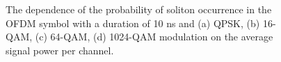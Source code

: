 \begin{figure}[htpb]
\begin{minipage}[h]{0.47\linewidth}
{        }
    \end{minipage}
    \vfill
    \begin{minipage}[h]{0.47\linewidth}
    \end{minipage}
    \hfill
    \begin{minipage}[h]{0.47\linewidth}
    \end{minipage}

    \caption{The dependence of the probability of soliton occurrence in the OFDM symbol with a duration of 10 ns and (a) QPSK, (b) 16-QAM, (c) 64-QAM, (d) 1024-QAM modulation on the average signal power per channel.}
    \label{fig:ofdm_result_mod_all}
\end{figure}

